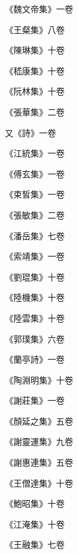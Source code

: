\begin{pinyinscope}
 《魏文帝集》一卷



 《王粲集》八卷



 《陳琳集》十卷



 《嵇康集》十卷



 《阮林集》十卷



 《張華集》二卷



 又《詩》一卷



 《江統集》一卷



 《傅玄集》一卷



 《束皙集》一卷



 《張敏集》二卷



 《潘岳集》七卷



 《索靖集》一卷



 《劉琨集》十卷



 《陸機集》十卷



 《陸雲集》十卷



 《郭璞集》六卷



 《蘭亭詩》一卷



 《陶淵明集》十卷



 《謝莊集》一卷



 《顏延之集》五卷



 《謝靈運集》九卷



 《謝惠連集》五卷



 《王僧達集》十卷



 《鮑昭集》十卷



 《江淹集》十卷



 《王融集》七卷




\end{pinyinscope}
